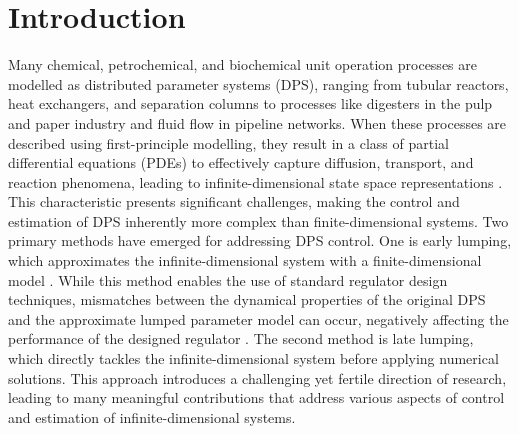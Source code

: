 \section{Introduction}

Many chemical, petrochemical, and biochemical unit operation processes are modelled as distributed parameter systems (DPS), ranging from tubular reactors, heat exchangers, and separation columns to processes like digesters in the pulp and paper industry and fluid flow in pipeline networks. When these processes are described using first-principle modelling, they result in a class of partial differential equations (PDEs) to effectively capture diffusion, transport, and reaction phenomena, leading to infinite-dimensional state space representations \autocite{ray1981advanced}. This characteristic presents significant challenges, making the control and estimation of DPS inherently more complex than finite-dimensional systems. Two primary methods have emerged for addressing DPS control. One is early lumping, which approximates the infinite-dimensional system with a finite-dimensional model \autocite{davison1976robust, francis1977linear}. While this method enables the use of standard regulator design techniques, mismatches between the dynamical properties of the original DPS and the approximate lumped parameter model can occur, negatively affecting the performance of the designed regulator \autocite{moghadam2012infinite}. The second method is late lumping, which directly tackles the infinite-dimensional system before applying numerical solutions. This approach introduces a challenging yet fertile direction of research, leading to many meaningful contributions that address various aspects of control and estimation of infinite-dimensional systems.

